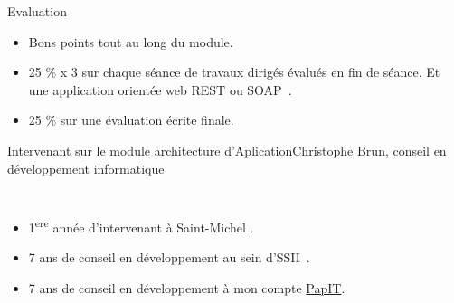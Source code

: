 \documentclass{beamer}
\begin{document}
    \begin{frame}{Evaluation}
        \begin{itemize}
            \item Bons points tout au long du module.
            \item 25 \% x 3 sur chaque séance de travaux dirigés évalués en fin de séance.
            Et une application orientée web REST ou SOAP~.
            \item 25 \% sur une évaluation écrite finale.
        \end{itemize}
    \end{frame}

    \begin{frame}{Intervenant sur le module architecture d'Aplication}{Christophe Brun, conseil en développement informatique}

        \begin{columns}
            \begin{itemize}
                \item 1\textsuperscript{ere} année d'intervenant à Saint-Michel .

                \item 7 ans de conseil en développement au sein d'SSII~.

                \item 7 ans de conseil en développement à mon compte \href{https://papit.fr}{PapIT}.


\end{itemize}
\end{columns}
\end{frame}
\end{document}
